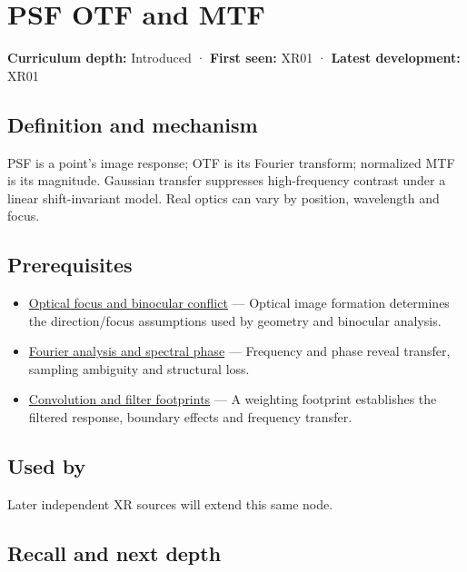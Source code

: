 \hypertarget{appendix-8b76b0efd27f}{}\label{referencestart:appendix-8b76b0efd27f}
\section{PSF OTF and MTF}\label{appendix-8b76b0efd27f-psf-otf-and-mtf}

\textbf{Curriculum depth:} Introduced · \textbf{First seen:} XR01 · \textbf{Latest development:} XR01

\subsection{Definition and mechanism}\label{appendix-8b76b0efd27f-definition-and-mechanism}

PSF is a point's image response; OTF is its Fourier transform; normalized MTF is its magnitude. Gaussian transfer suppresses high-frequency contrast under a linear shift-invariant model. Real optics can vary by position, wavelength and focus.

\subsection{Prerequisites}\label{appendix-8b76b0efd27f-prerequisites}

\begin{itemize}
\tightlist
\item
  \hyperref[appendix-f90cee1be7a4]{Optical focus and binocular conflict} --- Optical image formation determines the direction/focus assumptions used by geometry and binocular analysis.
\item
  \hyperref[appendix-b60686ba06a1]{Fourier analysis and spectral phase} --- Frequency and phase reveal transfer, sampling ambiguity and structural loss.
\item
  \hyperref[appendix-d5b3c692d9f0]{Convolution and filter footprints} --- A weighting footprint establishes the filtered response, boundary effects and frequency transfer.
\end{itemize}

\subsection{Used by}\label{appendix-8b76b0efd27f-used-by}

Later independent XR sources will extend this same node.

\subsection{Recall and next depth}\label{appendix-8b76b0efd27f-recall-and-next-depth}

